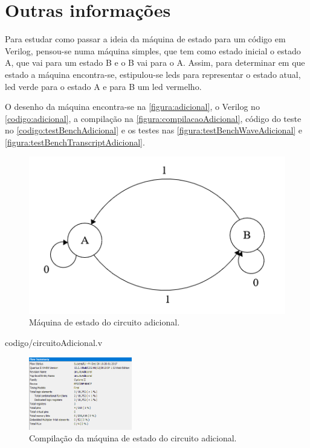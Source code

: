 \chapter{Outras informações}
	Para estudar como passar a ideia da máquina de estado para um código em
	Verilog, pensou-se numa máquina simples, que tem como estado inicial o estado A,
	que vai para um estado B e o B vai para o A. Assim, para determinar em que estado
	a máquina encontra-se, estipulou-se \ac{led}s para representar o estado atual,
	\ac{led} verde para o estado A e para B um \ac{led} vermelho.

	O desenho da máquina encontra-se na \autoref{figura:adicional},
	o Verilog no \autoref{codigo:adicional}, a compilação na
	\autoref{figura:compilacaoAdicional}, código do teste
	no \autoref{codigo:testBenchAdicional} e os testes nas
	\autoref{figura:testBenchWaveAdicional} e \autoref{figura:testBenchTranscriptAdicional}.

	\begin{figure}[H]
		\includegraphics{img/maquinaAdicional/maquinaEstado}
		\caption{Máquina de estado do circuito adicional.}
		\label{figura:adicional}
	\end{figure}

	
	{codigo/circuitoAdicional.v}

	\begin{figure}[H]
		\centering
		\includegraphics[width=0.4\textwidth]{img/maquinaAdicional/compilacao}
		\caption{Compilação da máquina de estado do circuito adicional.}
		\label{figura:compilacaoAdicional}
	\end{figure}

